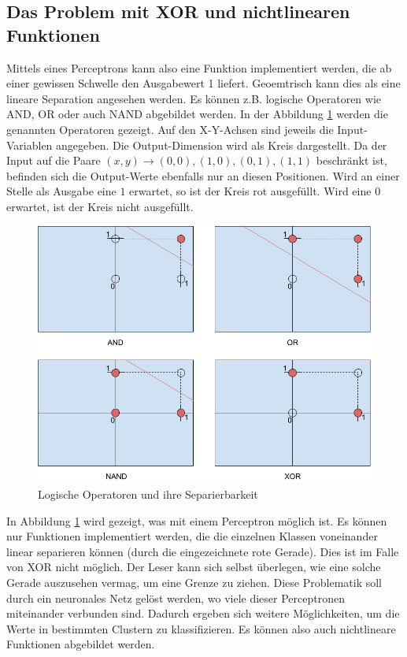 \subsection{Das Problem mit XOR und nichtlinearen Funktionen}\label{chapter:02_xor_perceptron}
Mittels eines Perceptrons kann also eine Funktion implementiert werden, die ab einer gewissen Schwelle den
Ausgabewert 1 liefert. Geoemtrisch kann dies als eine lineare Separation angesehen werden. Es können z.B. logische
Operatoren wie \glqq AND\grqq{}, \glqq OR\grqq{} oder auch \glqq NAND\grqq{} abgebildet werden.
In der Abbildung \ref{fig:06_logische_operatoren_1} werden die genannten Operatoren gezeigt. Auf den X-Y-Achsen
sind jeweils die Input-Variablen angegeben. Die Output-Dimension wird als Kreis dargestellt. Da der Input auf die Paare
$(x,y) \longrightarrow (0,0), (1,0), (0,1), (1,1)$ beschränkt ist, befinden sich die Output-Werte ebenfalls nur an diesen
Positionen. Wird an einer Stelle als Ausgabe eine $1$ erwartet, so ist der Kreis rot ausgefüllt. Wird eine $0$ erwartet,
ist der Kreis nicht ausgefüllt.
\begin{figure}[h!]
    \begin{center}
        \includegraphics[width=0.6\linewidth]{../common/01_neuronal_network/00_resources/01_logische_operatoren.png}
    \end{center}
    \caption{Logische Operatoren und ihre Separierbarkeit}
    \label{fig:06_logische_operatoren_1}
\end{figure}
In Abbildung \ref{fig:06_logische_operatoren_1} wird gezeigt, was mit einem Perceptron möglich ist. Es können nur
Funktionen implementiert werden, die die einzelnen Klassen voneinander linear separieren können (durch die eingezeichnete
rote Gerade). Dies ist im Falle von \glqq XOR\grqq{} nicht möglich. Der Leser kann sich selbst überlegen, wie eine solche
Gerade auszusehen vermag, um eine Grenze zu ziehen. Diese Problematik soll durch ein neuronales Netz gelöst werden, wo
viele dieser Perceptronen miteinander verbunden sind. Dadurch ergeben sich weitere Möglichkeiten, um die Werte in
bestimmten Clustern zu klassifizieren. Es können also auch nichtlineare Funktionen abgebildet werden.